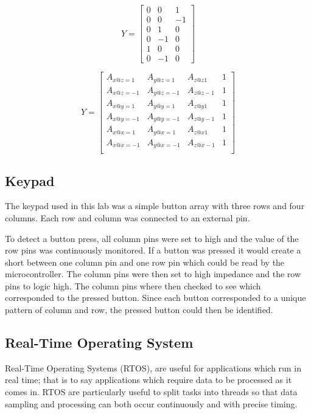 ﻿\documentclass[12pt]{article}
\begin{document}
\begin{equation} \label{cal_eq:3}
 Y = \begin{bmatrix} 0 & 0 & 1  \\
					  0 & 0 & -1 \\
                      0 & 1 & 0  \\
                      0 & -1 & 0 \\
                      1 & 0 & 0  \\
                      0 & -1 & 0
                      \end{bmatrix}
\end{equation}
                      
\begin{equation} \label{cal_eq:4}
 Y = \begin{bmatrix} A_{x@z=1} & A_{y@z=1} & A_{z@z1} & 1 \\
					  A_{x@z=-1} & A_{y@z=-1} & A_{z@z-1} & 1 \\
                      A_{x@y=1} & A_{y@y=1} & A_{z@y1} & 1 \\
                      A_{x@y=-1} & A_{y@y=-1} & A_{z@y-1} & 1 \\
                      A_{x@x=1} & A_{y@x=1} & A_{z@x1} & 1 \\
                      A_{x@x=-1} & A_{y@x=-1} & A_{z@x-1} & 1 \\
                      \end{bmatrix}
\end{equation}
\subsection{Keypad}
The keypad used in this lab was a simple button array with three rows and four columns. Each row and column was connected to an external pin.


To detect a button press, all column pins were set to high and the value of the row pins was continuously monitored. If a button was pressed it would create a short between one column pin and one row pin which could be read by the microcontroller. The column pins were then set to high impedance and the row pins to logic high. The column pins where then checked to see which corresponded to the pressed button. Since each button corresponded to a unique pattern of column and row, the pressed button could then be identified.
\subsection{Real-Time Operating System}
Real-Time Operating Systems (RTOS), are useful for applications which run in real time; that is to say applications which require data to be processed as it comes in. RTOS are particularly useful to split tasks into threads so that data sampling and processing can both occur continuously and with precise timing.
\end{document}
